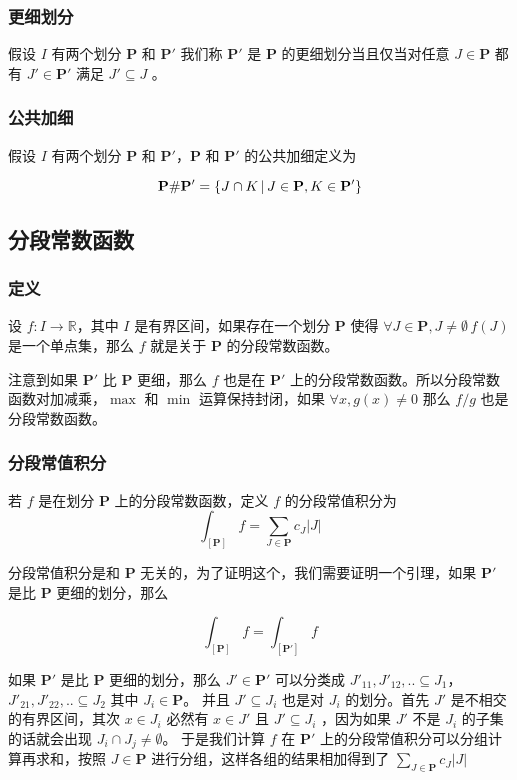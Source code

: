 \subsubsection{更细划分}

假设 $I $ 有两个划分 $\mathbf{P}$ 和 $\mathbf{P'}$ 我们称 $\mathbf{P'}$ 是 $\mathbf{P}$ 的更细划分当且仅当对任意 $J \in \mathbf{P}$ 都有 $J' \in \mathbf{P'}$ 满足 $J' \subseteq J$ 。

\subsubsection{公共加细}

假设 $I $ 有两个划分 $\mathbf{P}$ 和 $\mathbf{P'}$，$\mathbf{P}$ 和 $\mathbf{P'}$ 的公共加细定义为 

\[
    \mathbf{P} \# \mathbf{P'} = \{ J \cap K \,\vert\, J \in \mathbf{P}, K \in \mathbf{P'}\}
\]

\subsection{分段常数函数}

\subsubsection{定义}
设 $f: I \to \mathbb{R}$，其中 $I$ 是有界区间，如果存在一个划分 $\mathbf{P}$ 使得 $\forall J \in \mathbf{P}, J \ne \emptyset \, f(J)$ 是一个单点集，那么 $f$ 就是关于 $\mathbf{P}$ 的分段常数函数。

注意到如果 $\mathbf{P'}$ 比 $\mathbf{P}$ 更细，那么 $f$ 也是在 $\mathbf{P'}$ 上的分段常数函数。所以分段常数函数对加减乘，$\max$ 和 $\min$ 运算保持封闭，如果 $\forall x, g(x) \ne 0$ 那么 $f/g$ 也是分段常数函数。

\subsubsection{分段常值积分}

若 $f$ 是在划分 $\mathbf{P}$ 上的分段常数函数，定义 $f$ 的分段常值积分为 
\[
    \int_{[\mathbf{P}]} f = \sum_{J \in \mathbf{P}}c_J \lvert J \rvert
\]

分段常值积分是和 $\mathbf{P}$ 无关的，为了证明这个，我们需要证明一个引理，如果 $\mathbf{P'}$ 是比 $\mathbf{P}$ 更细的划分，那么

\[
    \int_{[\mathbf{P}]} f =\int_{[\mathbf{P'}]} f
\]

如果 $\mathbf{P'}$ 是比 $\mathbf{P}$ 更细的划分，那么 $J' \in \mathbf{P'}$ 可以分类成 $J'_{11}, J'_{12}, .. \subseteq J_1$， $J'_{21}, J'_{22}, .. \subseteq J_2$ 其中 $J_i \in \mathbf{P}$。
并且 $J' \subseteq J_i$ 也是对 $J_i$ 的划分。首先 $J'$ 是不相交的有界区间，其次 $x \in J_i$ 必然有 $x \in J'$ 且 $J' \subseteq J_i$ ，因为如果 $J'$ 不是 $J_i$ 的子集的话就会出现 $J_i \cap J_j \ne \emptyset$。
于是我们计算 $f$ 在 $\mathbf{P'}$ 上的分段常值积分可以分组计算再求和，按照 $J \in \mathbf{P}$ 进行分组，这样各组的结果相加得到了 $\sum_{J \in \mathbf{P}}c_J \lvert J \rvert$

